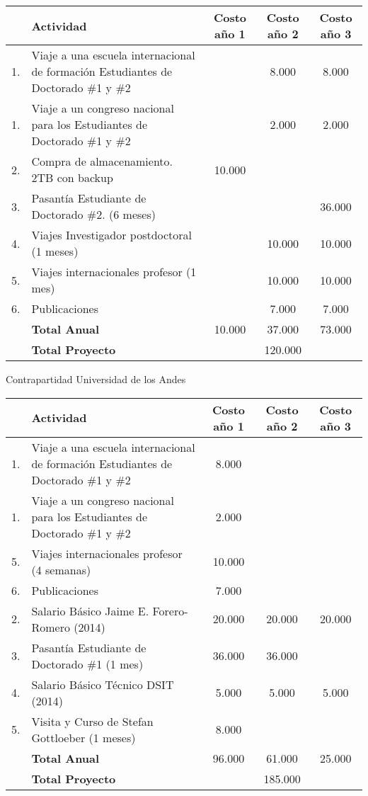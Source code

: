 \documentclass[12pt]{article}
\begin{document}
\begin{tabular}{|l |p{4.5cm}| c |c |c|}\hline
 & Actividad & Costo a\~no 1 & Costo a\~no 2 & Costo a\~no 3\\\hline
1. & Viaje a una escuela internacional de formaci\'on Estudiantes de
Doctorado \#1 y \#2 & & 8.000 & 8.000\\\hline
1. & Viaje a un congreso nacional para los Estudiantes de
Doctorado \#1 y \#2 & & 2.000 & 2.000 \\\hline
2. & Compra de almacenamiento. 2TB con backup & 10.000 & & \\\hline
3. & Pasant\'ia Estudiante de Doctorado \#2. (6 meses)& &  & 36.000\\\hline
4. & Viajes Investigador postdoctoral (1 meses)& & 10.000 & 10.000\\\hline
5. & Viajes internacionales profesor (1 mes) & & 10.000 & 10.000 \\ \hline
6. & Publicaciones &  & 7.000 & 7.000\\\hline 
& {\bf Total Anual} & 10.000 & 37.000 & 73.000\\\hline
& {{\bf Total Proyecto}} & \multicolumn{3}{|c|}{120.000}\\\hline
\end{tabular}


Contrapartidad Universidad de los Andes


\begin{tabular}{|l |p{4.5cm}| c |c |c|}\hline
& Actividad & Costo a\~no 1 & Costo a\~no 2 & Costo a\~no 3\\\hline
1. & Viaje a una escuela internacional de formaci\'on Estudiantes de
Doctorado \#1 y \#2 & 8.000 & & \\\hline
1. & Viaje a un congreso nacional para los Estudiantes de
Doctorado \#1 y \#2 & 2.000 & & \\\hline
5. & Viajes internacionales profesor (4 semanas) & 10.000 & & \\ \hline
6. & Publicaciones &  7.000 & & \\\hline 
2. & Salario B\'asico Jaime E. Forero-Romero (2014) & 20.000 & 20.000
& 20.000 \\\hline  

3. & Pasant\'ia Estudiante de Doctorado \#1 (1 mes) & 36.000 &
36.000 & \\\hline

4. & Salario B\'asico T\'ecnico DSIT (2014) & 5.000 & 5.000
& 5.000 \\\hline  

5. & Visita y Curso de Stefan Gottloeber (1 meses) & 8.000 & & \\\hline

& {\bf Total Anual} & 96.000 & 61.000 & 25.000\\\hline
& {{\bf Total Proyecto}} & \multicolumn{3}{|c|}{185.000}\\\hline

\end{tabular} 
\end{document}
